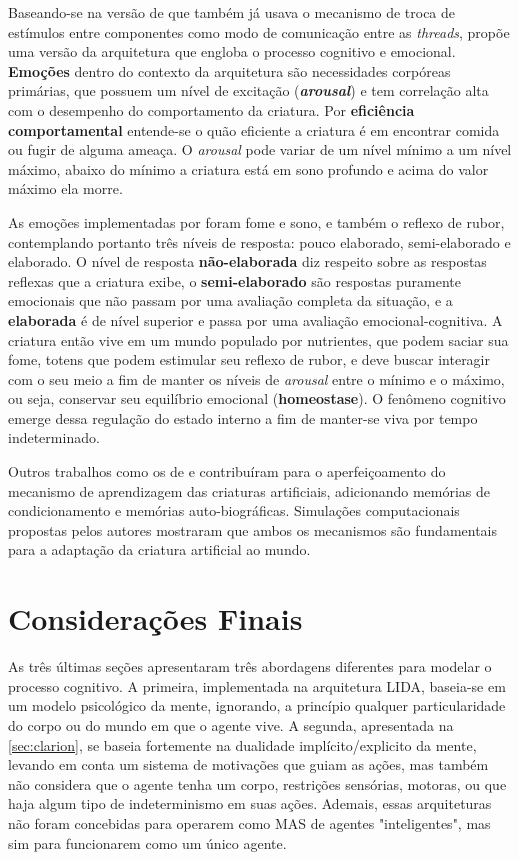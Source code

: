 Baseando-se na versão de  que também já usava o mecanismo de troca de estímulos entre componentes como modo de comunicação entre as \textit{threads},  propõe uma versão da arquitetura que engloba o processo cognitivo e emocional. \textbf{Emoções} dentro do contexto da arquitetura são necessidades corpóreas primárias, que possuem um nível de excitação (\textit{\textbf{arousal}}) e tem correlação alta com o desempenho do comportamento da criatura. Por \textbf{eficiência comportamental} entende-se o quão eficiente a criatura é em encontrar comida ou fugir de alguma ameaça. O \textit{arousal} pode variar de um nível mínimo a um nível máximo, abaixo do mínimo a criatura está em sono profundo e acima do valor máximo ela morre. 

As emoções implementadas por  foram  fome e sono,  e também o reflexo de rubor, contemplando portanto três níveis de resposta: pouco elaborado, semi-elaborado e elaborado. O nível de resposta \textbf{não-elaborada} diz respeito sobre as respostas reflexas que a criatura exibe, o \textbf{semi-elaborado} são respostas puramente emocionais que não passam por uma avaliação completa da situação, e a \textbf{elaborada} é de nível superior e passa por uma avaliação emocional-cognitiva. A criatura então vive em um mundo populado por nutrientes, que podem saciar sua fome, totens que podem estimular seu reflexo de rubor, e deve buscar interagir com o seu meio a fim de manter os níveis de \textit{arousal} entre o mínimo e o máximo, ou seja, conservar seu equilíbrio emocional (\textbf{homeostase}). O fenômeno cognitivo emerge dessa regulação do estado interno a fim de manter-se viva por tempo indeterminado.

Outros trabalhos como os de  e  contribuíram para o aperfeiçoamento do mecanismo de aprendizagem das criaturas artificiais, adicionando memórias de condicionamento e memórias auto-biográficas. Simulações computacionais propostas pelos autores mostraram que ambos os mecanismos são fundamentais para a adaptação da criatura artificial ao mundo. 

\section{Considerações Finais}
As três últimas seções apresentaram três abordagens diferentes para modelar o processo cognitivo. A primeira, implementada na arquitetura LIDA, baseia-se em um modelo psicológico da mente, ignorando, a princípio qualquer particularidade do corpo ou do mundo em que o agente vive. A segunda, apresentada na \autoref{sec:clarion}, se baseia fortemente na dualidade implícito/explicito da mente, levando em conta um sistema de motivações que guiam as ações, mas também não considera que o agente tenha um corpo, restrições sensórias, motoras, ou que haja algum tipo de indeterminismo em suas ações. Ademais, essas arquiteturas não foram concebidas para operarem como MAS de agentes "inteligentes", mas sim para funcionarem  como um único agente.

